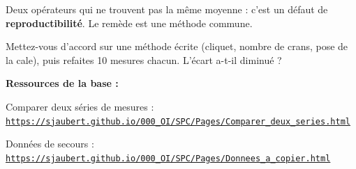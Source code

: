 \documentclass[10pt,a4paper]{article}
\begin{document}
\begin{tcolorbox}[retenir]Deux opérateurs qui ne trouvent pas la même moyenne : c'est un défaut de \textbf{reproductibilité}. Le remède est une méthode commune.\end{tcolorbox}
\begin{tcolorbox}[plus]Mettez-vous d'accord sur une méthode écrite (cliquet, nombre de crans, pose de la cale), puis refaites 10 mesures chacun. L'écart a-t-il diminué ?\end{tcolorbox}
\vfill{\footnotesize\color{uimm}\textbf{Ressources de la base :}\par Comparer deux séries de mesures : \href{https://sjaubert.github.io/000_OI/SPC/Pages/Comparer_deux_series.html}{\nolinkurl{https://sjaubert.github.io/000_OI/SPC/Pages/Comparer_deux_series.html}}\par Données de secours : \href{https://sjaubert.github.io/000_OI/SPC/Pages/Donnees_a_copier.html\#operateurs}{\nolinkurl{https://sjaubert.github.io/000_OI/SPC/Pages/Donnees_a_copier.html}}}
\end{document}
